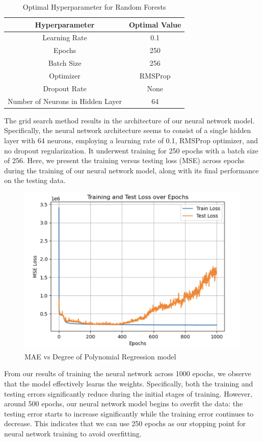 \documentclass[conference]{IEEEtran}
\begin{document}
\begin{table}[H]
\centering
\caption{Optimal Hyperparameter for Random Forests}
\begin{tabular}{|c|c|}
\hline
Hyperparameter & Optimal Value \\
\hline
Learning Rate & 0.1 \\
\hline
Epochs & 250 \\
\hline
Batch Size & 256 \\
\hline
Optimizer & RMSProp \\
\hline
Dropout Rate & None \\
\hline
Number of Neurons in Hidden Layer & 64 \\
\hline
\end{tabular}
\label{tab:mytable}
\end{table}

The grid search method results in the architecture of our neural network model. Specifically, the neural network architecture seems to consist of a single hidden layer with 64 neurons, employing a learning rate of 0.1, RMSProp optimizer, and no dropout regularization. It underwent training for 250 epochs with a batch size of 256. 
Here, we present the training versus testing loss (MSE) across epochs during the training of our neural network model, along with its final performance on the testing data.

\begin{figure}[H]
    \centering
    \includegraphics[width=0.8\linewidth]{1000.png} %
    \caption{MAE vs Degree of Polynomial Regression model}
    \label{fig:boxplots}
\end{figure}

From our results of training the neural network across 1000 epochs, we observe that the model effectively learns the weights. Specifically, both the training and testing errors significantly reduce during the initial stages of training. However, around 500 epochs, our neural network model begins to overfit the data: the testing error starts to increase significantly while the training error continues to decrease. This indicates that we can use 250 epochs as our stopping point for neural network training to avoid overfitting.
\end{document}
